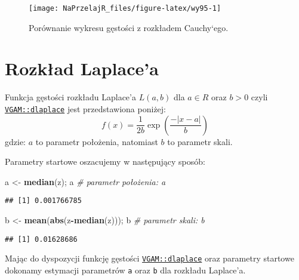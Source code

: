 \documentclass[polish,]{book}
\newenvironment{Shaded}{\begin{snugshade}}{\end{snugshade}}
\newcommand{\CommentTok}[1]{\textcolor[rgb]{0.56,0.35,0.01}{\textit{#1}}}
\newcommand{\KeywordTok}[1]{\textcolor[rgb]{0.13,0.29,0.53}{\textbf{#1}}}
\newcommand{\NormalTok}[1]{#1}
\newcommand{\OperatorTok}[1]{\textcolor[rgb]{0.81,0.36,0.00}{\textbf{#1}}}
\newcommand{\StringTok}[1]{\textcolor[rgb]{0.31,0.60,0.02}{#1}}
\begin{document}
\begin{figure}[h]

{\centering \texttt{[image: NaPrzelajR\_files/figure-latex/wy95-1]} 

}

\caption{Porównanie wykresu gęstości z rozkładem Cauchy`ego.}\label{fig:wy95}
\end{figure}

\hypertarget{part_9.5}{%
\section{Rozkład Laplace'a}\label{part_9.5}}

Funkcja gęstości rozkładu Laplace'a \(L(a, b)\) dla \(a \in R\) oraz \(b > 0\) czyli \href{https://rdrr.io/cran/VGAM/man/laplaceUC.html}{\texttt{VGAM::dlaplace}} jest przedstawiona poniżej:
\begin{equation}
f(x)=\frac{1}{2b}\exp\left(\frac{-|x-a|}{b}\right)
\label{eq:wz922}
\end{equation}
gdzie: \(a\) to parametr położenia, natomiast \(b\) to parametr skali.

Parametry startowe oszacujemy w następujący sposób:

\begin{Shaded}
\begin{Highlighting}[]
\NormalTok{a <-}\StringTok{ }\KeywordTok{median}\NormalTok{(z); a     }\CommentTok{# parametr położenia: a}
\end{Highlighting}
\end{Shaded}

\begin{verbatim}
## [1] 0.001766785
\end{verbatim}

\begin{Shaded}
\begin{Highlighting}[]
\NormalTok{b <-}\StringTok{ }\KeywordTok{mean}\NormalTok{(}\KeywordTok{abs}\NormalTok{(z}\OperatorTok{-}\KeywordTok{median}\NormalTok{(z))); b }\CommentTok{# parametr skali: b}
\end{Highlighting}
\end{Shaded}

\begin{verbatim}
## [1] 0.01628686
\end{verbatim}

Mając do dyspozycji funkcję gęstości \href{https://rdrr.io/cran/VGAM/man/laplaceUC.html}{\texttt{VGAM::dlaplace}} oraz parametry startowe dokonamy estymacji parametrów \texttt{a} oraz \texttt{b} dla rozkładu Laplace'a.
\end{document}

